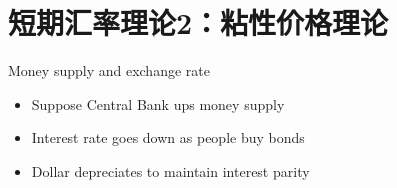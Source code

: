\documentclass[10pt,hyperref={CJKbookmarks=true},xcolor=dvipsnames,aspectratio=169]{beamer}
\begin{document}
\section{短期汇率理论2：粘性价格理论}

\begin{frame}{Money supply and exchange rate}

\begin{itemize}
\item Suppose Central Bank ups money supply
\item Interest rate goes down as people buy bonds
\item Dollar depreciates to maintain interest parity 
\end{itemize}
\end{frame}

\end{document}

